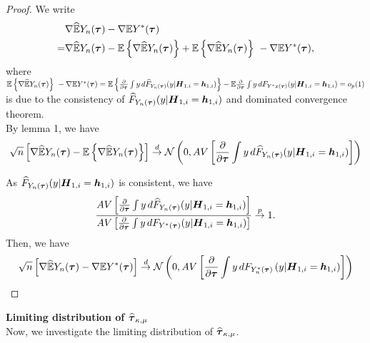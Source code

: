 \documentclass[../main.tex]{subfiles}
\begin{document}
\begin{proof}
We write
\begin{gather}
\begin{flalign*}
& \nabla \widehat{\mathbb{E}} Y_n(\boldsymbol{\tau})  - \nabla \mathbb{E}Y^*(\boldsymbol{\tau}) \\
= & \nabla \widehat{\mathbb{E}} Y_n(\boldsymbol{\tau})  - \mathbb{E}\left\{ \nabla \widehat{\mathbb{E}}Y_n(\boldsymbol{\tau}) \right\}  + \mathbb{E}\left\{ \nabla \widehat{\mathbb{E}}Y_n(\boldsymbol{\tau}) \right\}\ - \nabla \mathbb{E}Y^*(\boldsymbol{\tau}),
\end{flalign*}
\end{gather}
where $ \mb{E}\lt\{ \nabla \wh{\mb{E}}Y_n(\bs{\tau}) \rt\}\ - \nabla \mb{E}Y^*(\bs{\tau}) =  \mb{E}\lt\{\pard[\bs{\tau}]\int y \,d  \wh{F}_{Y_n(\bs{\tau})}(y | \bs{H}_{1,i} = \bs{h}_{1,i})\rt\}  - \mb{E} \pard[\bs{\tau}]\int y \,d  F_{Y^*x(\bs{\tau})}(y | \bs{H}_{1,i} = \bs{h}_{1,i}) = o_p(1)$ is due to the consistency of $\widehat{F}_{Y_n(\boldsymbol{\tau})}(y | \boldsymbol{H}_{1,i} = \boldsymbol{h}_{1,i})$ and dominated convergence theorem.\\
By lemma 1, we have
\begin{gather}
\begin{flalign*}
\sqrt{n}\lt[\nabla \wh{\mb{E}} Y_n(\bs{\tau})  -\mathbb{E}\lt\{\nabla \wh{\mb{E}} Y_n(\bs{\tau})\rt\}\rt]\overset{d}{\to}\mathcal{N}\lt(0,AV\lt[\pard[\bs{\tau}] \int y \,d  \wh{F}_{Y_n(\bs{\tau})}(y | \bs{H}_{1,i} = \bs{h}_{1,i}) \rt]\rt)
\end{flalign*}
\end{gather}

As $\widehat{F}_{Y_n(\boldsymbol{\tau})}(y | \boldsymbol{H}_{1,i} = \boldsymbol{h}_{1,i})$ is consistent, we have
\begin{gather*}
\frac{AV\lt[\pard[\bs{\tau}] \int y \,d  \wh{F}_{Y_n(\bs{\tau})}(y | \bs{H}_{1,i} = \bs{h}_{1,i}) \rt]}{AV\lt[\pard[\bs{\tau}] \int y \,d  F_{Y^*(\bs{\tau})}(y | \bs{H}_{1,i} = \bs{h}_{1,i}) \rt]} \overset{p}{\to} 1.
\end{gather*}
Then, we have
\begin{gather}
\begin{flalign*}
\sqrt{n}\lt[\nabla \wh{\mb{E}} Y_n(\bs{\tau})  - \nabla \mb{E}Y^*(\bs{\tau})\rt]\overset{d}{\to}\mathcal{N}\lt(0,AV\lt[\pard[\bs{\tau}] \int y \,d  F_{Y^*_n(\bs{\tau})}\lt(y | \bs{H}_{1,i} = \bs{h}_{1,i}\rt) \rt]\rt)
\end{flalign*}
\end{gather}
\end{proof}		


\textbf{Limiting distribution of $\widehat{\boldsymbol{\tau}}_{\kappa,\mu}$}\\
Now, we investigate the limiting distribution of $\widehat{\boldsymbol{\tau}}_{\kappa,\mu}$.
\end{document}
